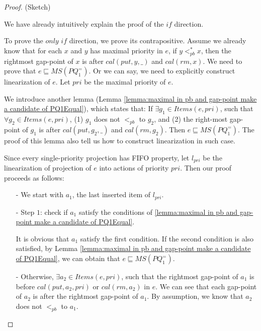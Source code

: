 \begin {proof} (Sketch)

We have already intuitively explain the proof of the $\textit{if}$ direction.

To prove the $\textit{only if}$ direction, we prove its contrapositive. Assume we already know that for each $x$ and $y$ has maximal priority in $e$, if $y <_{\textit{pb}}^* x$, then the rightmost gap-point of $x$ is after $\textit{cal}(\textit{put},y,\_)$ and $\textit{cal}(\textit{rm},x)$. We need to prove that $e \sqsubseteq \textit{MS}(\textit{PQ}_1^{=})$. Or we can say, we need to explicitly construct linearization of $e$. Let $\textit{pri}$ be the maximal priority of $e$.

We introduce another lemma (Lemma \ref{lemma:maximal in pb and gap-point make a candidate of PQ1Equal}), which states that: If $\exists g_1 \in \textit{Items}(e,\textit{pri})$, such that $\forall g_2 \in \textit{Items}(e,\textit{pri})$, (1) $g_1$ does not $<_{\textit{pb}}$ to $g_2$, and (2) the right-most gap-point of $g_1$ is after $\textit{cal}(\textit{put},g_2,\_)$ and $\textit{cal}(\textit{rm},g_2)$. Then $e \sqsubseteq \textit{MS}(\textit{PQ}_1^{=})$. The proof of this lemma also tell us how to construct linearization in such case.

Since every single-priority projection has FIFO property, let $l_{\textit{pri}}$ be the linearization of projection of $e$ into actions of priority $\textit{pri}$. Then our proof proceeds as follows:


\begin{itemize}
\setlength{\itemsep}{0.5pt}
\item[-] We start with $a_1$, the last inserted item of $l_{\textit{pri}}$.

\item[-] Step $1$: check if $a_1$ satisfy the conditions of \ref{lemma:maximal in pb and gap-point make a candidate of PQ1Equal}.

    It is obvious that $a_1$ satisfy the first condition. If the second condition is also satisfied, by Lemma \ref{lemma:maximal in pb and gap-point make a candidate of PQ1Equal}, we can obtain that $e \sqsubseteq \textit{MS}(\textit{PQ}_1^{=})$.

\item[-] Otherwise, $\exists a_2 \in \textit{Items}(e,\textit{pri})$, such that the rightmost gap-point of $a_1$ is before $\textit{cal}(\textit{put},a_2,\textit{pri})$ or $\textit{cal}(\textit{rm},a_2)$ in $e$. We can see that each gap-point of $a_2$ is after the rightmost gap-point of $a_1$. By assumption, we know that $a_2$ does not $<_{\textit{pb}}$ to $a_1$.


\end{itemize}
\end{proof}
